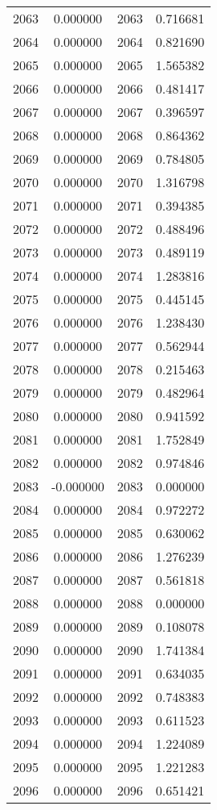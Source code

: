 \documentclass[12pt]{article}
\begin{document}
\begin{longtable}{@{}cccc@{}}
2063 & 0.000000 & 2063 & 0.716681 \\
2064 & 0.000000 & 2064 & 0.821690 \\
2065 & 0.000000 & 2065 & 1.565382 \\
2066 & 0.000000 & 2066 & 0.481417 \\
2067 & 0.000000 & 2067 & 0.396597 \\
2068 & 0.000000 & 2068 & 0.864362 \\
2069 & 0.000000 & 2069 & 0.784805 \\
2070 & 0.000000 & 2070 & 1.316798 \\
2071 & 0.000000 & 2071 & 0.394385 \\
2072 & 0.000000 & 2072 & 0.488496 \\
2073 & 0.000000 & 2073 & 0.489119 \\
2074 & 0.000000 & 2074 & 1.283816 \\
2075 & 0.000000 & 2075 & 0.445145 \\
2076 & 0.000000 & 2076 & 1.238430 \\
2077 & 0.000000 & 2077 & 0.562944 \\
2078 & 0.000000 & 2078 & 0.215463 \\
2079 & 0.000000 & 2079 & 0.482964 \\
2080 & 0.000000 & 2080 & 0.941592 \\
2081 & 0.000000 & 2081 & 1.752849 \\
2082 & 0.000000 & 2082 & 0.974846 \\
2083 & -0.000000 & 2083 & 0.000000 \\
2084 & 0.000000 & 2084 & 0.972272 \\
2085 & 0.000000 & 2085 & 0.630062 \\
2086 & 0.000000 & 2086 & 1.276239 \\
2087 & 0.000000 & 2087 & 0.561818 \\
2088 & 0.000000 & 2088 & 0.000000 \\
2089 & 0.000000 & 2089 & 0.108078 \\
2090 & 0.000000 & 2090 & 1.741384 \\
2091 & 0.000000 & 2091 & 0.634035 \\
2092 & 0.000000 & 2092 & 0.748383 \\
2093 & 0.000000 & 2093 & 0.611523 \\
2094 & 0.000000 & 2094 & 1.224089 \\
2095 & 0.000000 & 2095 & 1.221283 \\
2096 & 0.000000 & 2096 & 0.651421 \\

\end{longtable}
\end{document}
